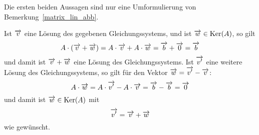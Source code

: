 \beweis Die ersten beiden Aussagen sind nur eine Umformulierung von 
Bemerkung~\ref{matrix_lin_abb}.

Ist $\overrightarrow{v}$ eine Lösung des gegebenen Gleichungssystems, und ist 
$\overrightarrow{w} \in \textrm{Ker}(A)$, so gilt
  	$$ A \cdot \left(\overrightarrow{v} + \overrightarrow{w}\right) = 
  	A \cdot \overrightarrow{v} + A \cdot \overrightarrow{w} = \overrightarrow{b} 
 	+ \overrightarrow{0} = \overrightarrow{b} $$
und damit ist $\overrightarrow{v} + \overrightarrow{w}$ eine Lösung des 
Gleichungssystems. Ist $\overrightarrow{v'}$ eine weitere Lösung des 
Gleichungssystems, so gilt für den Vektor $\overrightarrow{w} = \overrightarrow{v'} 
- \overrightarrow{v}$:
  	$$ A \cdot \overrightarrow{w} = A \cdot \overrightarrow{v'} - A \cdot 
  	\overrightarrow{v} = \overrightarrow{b} - \overrightarrow{b} = 
  	\overrightarrow{0} $$
und damit ist $\overrightarrow{w} \in \textrm{Ker}(A)$ mit 
  	$$ \overrightarrow{v'} = \overrightarrow{v} + \overrightarrow{w} $$
wie gewünscht.

\medbreak

